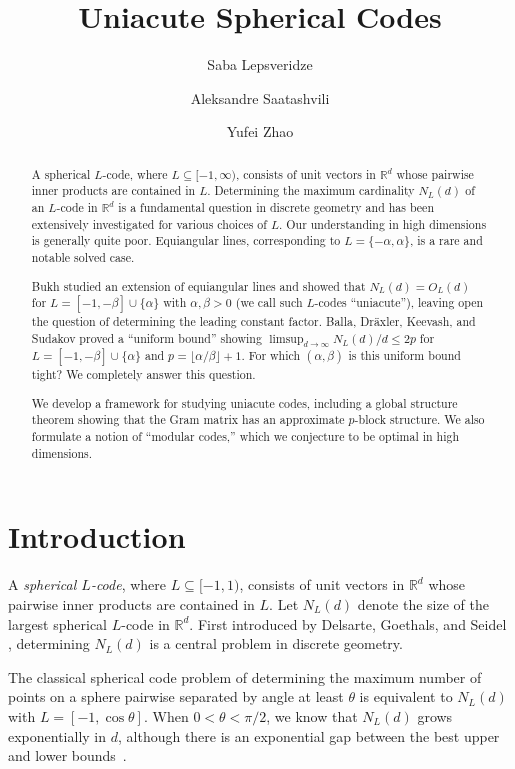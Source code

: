 \documentclass[reqno, 11pt]{amsart}
\title{Uniacute Spherical Codes}
\author[Lepsveridze]{Saba Lepsveridze}
\author[Saatashvili]{Aleksandre Saatashvili}
\author[Zhao]{Yufei Zhao}
\theoremstyle{definition}
\theoremstyle{remark}
\newcommand{\RR}{\mathbb{R}}
\begin{document}
 

\begin{abstract}
A spherical $L$-code, where $L \subseteq [-1,\infty)$,
consists of unit vectors in $\mathbb{R}^d$ whose pairwise inner products are contained in $L$. 
Determining the maximum cardinality $N_L(d)$ of an $L$-code in $\mathbb{R}^d$ is a fundamental question in discrete geometry and has been extensively investigated for various choices of $L$.
Our understanding in high dimensions is generally quite poor. 
Equiangular lines, corresponding to $L = \{-\alpha, \alpha\}$, is a rare and notable solved case.

Bukh studied an extension of equiangular lines and showed that $N_L(d) = O_L(d)$ for $L = [-1, -\beta] \cup \{\alpha\}$ with $\alpha,\beta > 0$ (we call such $L$-codes ``uniacute''), leaving open the question of determining the leading constant factor.
Balla, Dr\"{a}xler, Keevash, and Sudakov proved a ``uniform bound'' showing $\limsup_{d\to\infty} N_L(d)/d \le 2p$ for $L = [-1, -\beta] \cup \{\alpha\}$ and $p = \lfloor \alpha/\beta \rfloor + 1$.
For which $(\alpha,\beta)$ is this uniform bound tight?
We completely answer this question.

We develop a framework for studying uniacute codes, including a global structure theorem showing that the Gram matrix has an approximate $p$-block structure. 
We also formulate a notion of ``modular codes,'' which we conjecture to be optimal in high dimensions.
\end{abstract}

\maketitle

\section{Introduction}

A \emph{spherical $L$-code}, where $L \subseteq [-1,1)$, consists of unit vectors in $\RR^d$ whose pairwise inner products are contained in $L$.
Let $N_L(d)$ denote the size of the largest spherical $L$-code in $\RR^d$. 
First introduced by Delsarte, Goethals, and Seidel \cite{DGS77}, determining $N_L(d)$ is a central problem in discrete geometry. 

The classical spherical code problem of determining the maximum number of points on a sphere pairwise separated by angle at least $\theta$ is equivalent to $N_L(d)$ with $L = [-1, \cos\theta]$. When $0 < \theta < \pi/2$, we know that $N_L(d)$ grows exponentially in $d$, although there is an exponential gap between the best upper and lower bounds~\cite{KL78,JJP18}.
\end{document}
